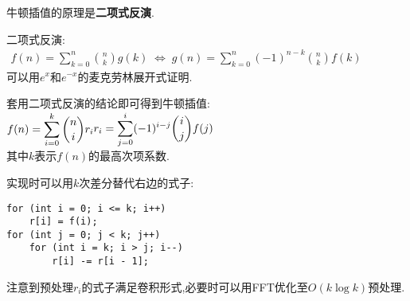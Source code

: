 牛顿插值的原理是{\bfseries 二项式反演}.

二项式反演: \\
\begin{math}
\begin{aligned}
f(n)=\sum_{k=0}^n{n\choose k}g(k)\;\Leftrightarrow\;g(n)=\sum_{k=0}^n\left(-1\right)^{n-k}{n\choose k}f(k)
\end{aligned}
\end{math} \\
可以用$e^x$和$e^{-x}​$的麦克劳林展开式证明.

套用二项式反演的结论即可得到牛顿插值: \\
\begin{math}
\begin{aligned} f(n)=\sum_{i=0}^{k}{n\choose i}r_i \end{aligned} \\ 
\begin{aligned} r_i=\sum_{j=0}^i(-1)^{i-j}{i\choose j}f(j) \end{aligned}
\end{math} \\
其中$k$表示$f(n)$的最高次项系数.

实现时可以用$k$次差分替代右边的式子:

\begin{verbatim}
for (int i = 0; i <= k; i++)
    r[i] = f(i);
for (int j = 0; j < k; j++)
    for (int i = k; i > j; i--)
        r[i] -= r[i - 1];
\end{verbatim}

注意到预处理$r_i​$的式子满足卷积形式,必要时可以用FFT优化至$O(k\log k)​$预处理.